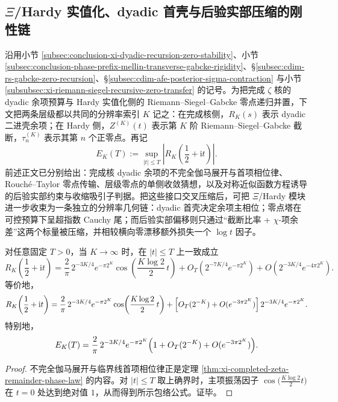\subsection{\texorpdfstring{$\Xi$}{Xi}/Hardy 实值化、dyadic 首壳与后验实部压缩的刚性链}\label{subsec:conclusion-xi-hardy-dyadic-shell-posterior-sigma-rigidity}
沿用小节 \ref{subsec:conclusion-xi-dyadic-recursion-zero-stability}、小节 \ref{subsec:conclusion-phase-prefix-mellin-transverse-gabcke-rigidity}、\S\ref{subsec:cdim-rs-gabcke-zero-recursion}、\S\ref{subsec:cdim-afe-posterior-sigma-contraction} 与小节 \ref{subsubsec:xi-riemann-siegel-recursive-zero-transfer} 的记号。为把完成 \(\zeta\) 核的 dyadic 余项预算与 Hardy 实值化侧的 Riemann--Siegel--Gabcke 零点递归并置，下文把两条层级都以共同的分辨率索引 \(K\) 记之：在完成核侧，\(R_K(s)\) 表示 dyadic 二进壳余项；在 Hardy 侧，\(Z^{(K)}(t)\) 表示第 \(K\) 阶 Riemann--Siegel--Gabcke 截断，\(\tau_n^{(K)}\) 表示其第 \(n\) 个正零点。再记
\[
E_K(T):=\sup_{|t|\le T}\left|R_K\!\left(\frac12+\mathrm{i}t\right)\right|.
\]
前述正文已分别给出：完成核 dyadic 余项的不完全伽马展开与首项相位律、Rouch\'e--Taylor 零点传输、层级零点的单侧收敛猜想，以及对称近似函数方程诱导的后验实部约束与收缩吸引子判据。把这些接口交叉压缩后，可把 \(\Xi\)/Hardy 模块进一步收束为一条独立的分辨率几何链：dyadic 首壳决定余项主相位；零点塔在可控预算下呈超指数 Cauchy 尾；而后验实部偏移则只通过“截断比率 + \(\chi\)-项余差”这两个标量被压缩，并相较横向零漂移额外损失一个 \(\log t\) 因子。

\begin{theorem}\label{thm:conclusion-xi-dyadic-shell-envelope-law}
对任意固定 \(T>0\)，当 \(K\to\infty\) 时，在 \(|t|\le T\) 上一致成立
\[
R_K\!\left(\frac12+\mathrm{i}t\right)
=
\frac{2}{\pi}\,2^{-3K/4}e^{-\pi 2^K}
\cos\!\left(\frac{K\log 2}{2}\,t\right)
+ O_T\!\left(2^{-7K/4}e^{-\pi 2^K}\right)
+ O\!\left(2^{-3K/4}e^{-4\pi 2^K}\right).
\]
等价地，
\[
R_K\!\left(\frac12+\mathrm{i}t\right)
=
\frac{2}{\pi}\,2^{-3K/4}e^{-\pi 2^K}
\cos\!\left(\frac{K\log 2}{2}\,t\right)
+ \Bigl[O_T(2^{-K})+O(e^{-3\pi 2^K})\Bigr]\,
2^{-3K/4}e^{-\pi 2^K}.
\]
特别地，
\[
E_K(T)
=
\frac{2}{\pi}\,2^{-3K/4}e^{-\pi 2^K}
\Bigl(1+O_T(2^{-K})+O(e^{-3\pi 2^K})\Bigr).
\]
\end{theorem}
\begin{proof}
不完全伽马展开与临界线首项相位律正是定理 \ref{thm:xi-completed-zeta-remainder-phase-law} 的内容。对 \(|t|\le T\) 取上确界时，主项振荡因子
\(
\cos\bigl(\frac{K\log2}{2}t\bigr)
\)
在 \(t=0\) 处达到绝对值 \(1\)，从而得到所示包络公式。证毕。
\end{proof}

